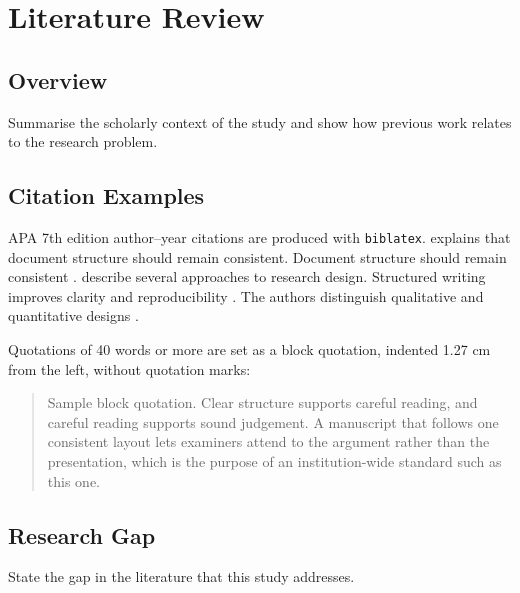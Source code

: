 \chapter{Literature Review}

\section{Overview}

Summarise the scholarly context of the study and show how previous work
relates to the research problem.

\section{Citation Examples}

APA 7th edition author--year citations are produced with \texttt{biblatex}.
\textcite{lamport1994} explains that document structure should remain
consistent. Document structure should remain consistent \parencite{lamport1994}.
\textcite{creswell2018} describe several approaches to research design.
Structured writing improves clarity and reproducibility
\parencite{knuth1984,lamport1994}. The authors distinguish qualitative and
quantitative designs \parencite[3--5]{creswell2018}.

Quotations of 40 words or more are set as a block quotation, indented 1.27 cm
from the left, without quotation marks:

\begin{quote}
Sample block quotation. Clear structure supports careful reading, and careful
reading supports sound judgement. A manuscript that follows one consistent
layout lets examiners attend to the argument rather than the presentation,
which is the purpose of an institution-wide standard such as this one.
\parencite[p.~18]{lamport1994}
\end{quote}

\section{Research Gap}

State the gap in the literature that this study addresses.
